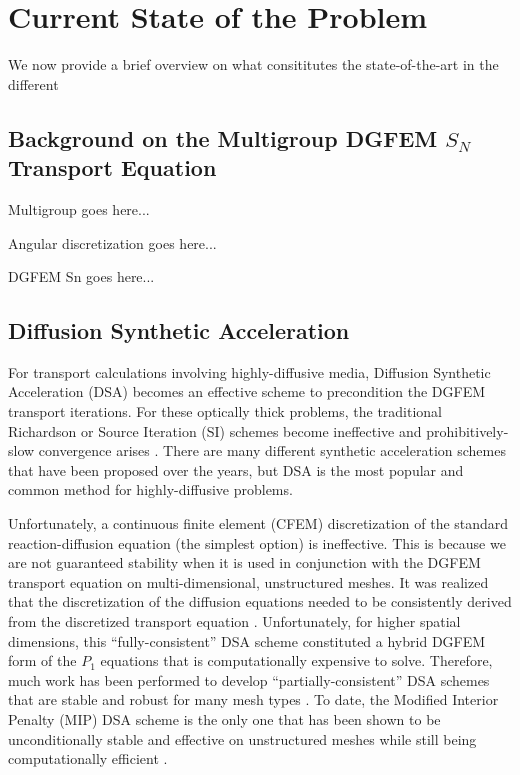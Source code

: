 \section{Current State of the Problem}
\label{sec::Intro_Past}

We now provide a brief overview on what consititutes the state-of-the-art in the different 

\subsection{Background on the Multigroup DGFEM $S_N$ Transport Equation}
\label{sec::Intro_Past_DGFEMMGSn}

Multigroup goes here...

Angular discretization goes here...

DGFEM Sn goes here...

\subsection{Diffusion Synthetic Acceleration}
\label{sec::Intro_Past_DSA}

For transport calculations involving highly-diffusive media, Diffusion Synthetic Acceleration (DSA) becomes an effective scheme to precondition the DGFEM transport iterations. For these optically thick problems, the traditional Richardson or Source Iteration (SI) schemes become ineffective and prohibitively-slow convergence arises \cite{ref::adams_larsen_iter_methods}. There are many different synthetic acceleration schemes that have been proposed over the years, but DSA is the most popular and common method for highly-diffusive problems.

Unfortunately, a continuous finite element (CFEM) discretization of the standard reaction-diffusion equation (the simplest option) is ineffective. This is because we are not guaranteed stability when it is used in conjunction with the DGFEM transport equation on multi-dimensional, unstructured meshes. It was realized that the discretization of the diffusion equations needed to be consistently derived from the discretized transport equation \cite{alcouffe1976stable,alcouffe1977DSA,larsen1982unconditionally_I,larsen1982unconditionally_II,warsa2002fully}. Unfortunately, for higher spatial dimensions, this ``fully-consistent'' DSA scheme constituted a hybrid DGFEM form of the $P_1$ equations that is computationally expensive to solve. Therefore, much work has been performed to develop ``partially-consistent'' DSA schemes that are stable and robust for many mesh types \cite{ref::dsa_DFEM_adams_martin,wareing1991diffusion,ref::DSA_wang_ragusa}. To date, the Modified Interior Penalty (MIP) DSA scheme is the only one that has been shown to be unconditionally stable and effective on unstructured meshes while still being computationally efficient \cite{ref::DSA_wang_ragusa,turcksin2014discontinuous}.


